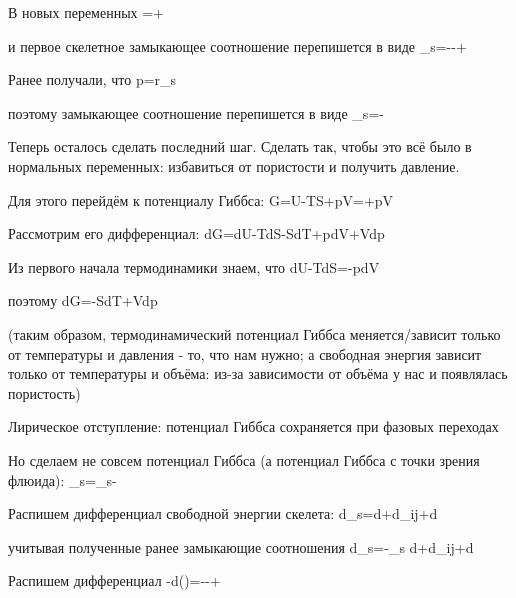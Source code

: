 \documentclass[main.tex]{subfiles}
\begin{document}
В новых переменных
\beq
{}=+\frac{\partial\varphi}{\partial\theta}
\eeq

и первое скелетное замыкающее соотношение перепишется в виде
\beq
\eta_s=--\frac{\partial\varphi}{\partial\theta}+\frac{\partial\varphi}{\partial\theta}
\eeq

Ранее получали, что 
\beq
p=r_s
\eeq

поэтому замыкающее соотношение перепишется в виде
\beq
\eta_s=-
\eeq

Теперь осталось сделать последний шаг. Сделать так, чтобы это всё было в нормальных переменных: избавиться от пористости и получить давление.

Для этого перейдём к потенциалу Гиббса:
\beq
G=U-TS+pV=\Psi+pV
\eeq

Рассмотрим его дифференциал:
\beq
dG=dU-TdS-SdT+pdV+Vdp
\eeq

Из первого начала термодинамики знаем, что
\beq
dU-TdS=-pdV
\eeq

поэтому
\beq
dG=-SdT+Vdp
\eeq

(таким образом, термодинамический потенциал Гиббса меняется/зависит только от температуры и давления - то, что нам нужно; а свободная энергия зависит только от температуры и объёма: из-за зависимости от объёма у нас и появлялась пористость)

Лирическое отступление: потенциал Гиббса сохраняется при фазовых переходах

Но сделаем не совсем потенциал Гиббса (а потенциал Гиббса с точки зрения флюида):
\beq
\Phi_s=\tilde{\Psi}_s-
\eeq

Распишем дифференциал свободной энергии скелета:
\beq
d\tilde{\Psi}_s=d\theta+d\varepsilon_{ij}+d\varphi
\eeq

учитывая полученные ранее замыкающие соотношения
\beq
d\tilde{\Psi}_s=-\eta_s d\theta+d\varepsilon_{ij}+d\varphi
\eeq

Распишем дифференциал
\beq
-d\left(\right)=--+
\eeq
\end{document}
